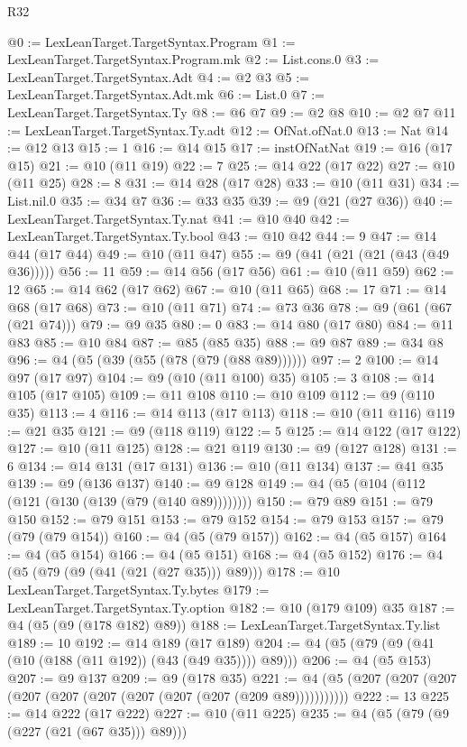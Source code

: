 \begin{lexlean}{R32}
\begin{coremodule}
@0 := LexLeanTarget.TargetSyntax.Program
@1 := LexLeanTarget.TargetSyntax.Program.mk
@2 := List.cons.{0}
@3 := LexLeanTarget.TargetSyntax.Adt
@4 := @2 @3
@5 := LexLeanTarget.TargetSyntax.Adt.mk
@6 := List.{0}
@7 := LexLeanTarget.TargetSyntax.Ty
@8 := @6 @7
@9 := @2 @8
@10 := @2 @7
@11 := LexLeanTarget.TargetSyntax.Ty.adt
@12 := OfNat.ofNat.{0}
@13 := Nat
@14 := @12 @13
@15 := 1
@16 := @14 @15
@17 := instOfNatNat
@19 := @16 (@17 @15)
@21 := @10 (@11 @19)
@22 := 7
@25 := @14 @22 (@17 @22)
@27 := @10 (@11 @25)
@28 := 8
@31 := @14 @28 (@17 @28)
@33 := @10 (@11 @31)
@34 := List.nil.{0}
@35 := @34 @7
@36 := @33 @35
@39 := @9 (@21 (@27 @36))
@40 := LexLeanTarget.TargetSyntax.Ty.nat
@41 := @10 @40
@42 := LexLeanTarget.TargetSyntax.Ty.bool
@43 := @10 @42
@44 := 9
@47 := @14 @44 (@17 @44)
@49 := @10 (@11 @47)
@55 := @9 (@41 (@21 (@21 (@43 (@49 @36)))))
@56 := 11
@59 := @14 @56 (@17 @56)
@61 := @10 (@11 @59)
@62 := 12
@65 := @14 @62 (@17 @62)
@67 := @10 (@11 @65)
@68 := 17
@71 := @14 @68 (@17 @68)
@73 := @10 (@11 @71)
@74 := @73 @36
@78 := @9 (@61 (@67 (@21 @74)))
@79 := @9 @35
@80 := 0
@83 := @14 @80 (@17 @80)
@84 := @11 @83
@85 := @10 @84
@87 := @85 (@85 @35)
@88 := @9 @87
@89 := @34 @8
@96 := @4 (@5 (@39 (@55 (@78 (@79 (@88 @89))))))
@97 := 2
@100 := @14 @97 (@17 @97)
@104 := @9 (@10 (@11 @100) @35)
@105 := 3
@108 := @14 @105 (@17 @105)
@109 := @11 @108
@110 := @10 @109
@112 := @9 (@110 @35)
@113 := 4
@116 := @14 @113 (@17 @113)
@118 := @10 (@11 @116)
@119 := @21 @35
@121 := @9 (@118 @119)
@122 := 5
@125 := @14 @122 (@17 @122)
@127 := @10 (@11 @125)
@128 := @21 @119
@130 := @9 (@127 @128)
@131 := 6
@134 := @14 @131 (@17 @131)
@136 := @10 (@11 @134)
@137 := @41 @35
@139 := @9 (@136 @137)
@140 := @9 @128
@149 := @4 (@5 (@104 (@112 (@121 (@130 (@139 (@79 (@140 @89))))))))
@150 := @79 @89
@151 := @79 @150
@152 := @79 @151
@153 := @79 @152
@154 := @79 @153
@157 := @79 (@79 (@79 @154))
@160 := @4 (@5 (@79 @157))
@162 := @4 (@5 @157)
@164 := @4 (@5 @154)
@166 := @4 (@5 @151)
@168 := @4 (@5 @152)
@176 := @4 (@5 (@79 (@9 (@41 (@21 (@27 @35))) @89)))
@178 := @10 LexLeanTarget.TargetSyntax.Ty.bytes
@179 := LexLeanTarget.TargetSyntax.Ty.option
@182 := @10 (@179 @109) @35
@187 := @4 (@5 (@9 (@178 @182) @89))
@188 := LexLeanTarget.TargetSyntax.Ty.list
@189 := 10
@192 := @14 @189 (@17 @189)
@204 := @4 (@5 (@79 (@9 (@41 (@10 (@188 (@11 @192)) (@43 (@49 @35)))) @89)))
@206 := @4 (@5 @153)
@207 := @9 @137
@209 := @9 (@178 @35)
@221 := @4 (@5 (@207 (@207 (@207 (@207 (@207 (@207 (@207 (@207 (@207 (@209 @89)))))))))))
@222 := 13
@225 := @14 @222 (@17 @222)
@227 := @10 (@11 @225)
@235 := @4 (@5 (@79 (@9 (@227 (@21 (@67 @35))) @89)))

\end{coremodule}
\end{lexlean}
